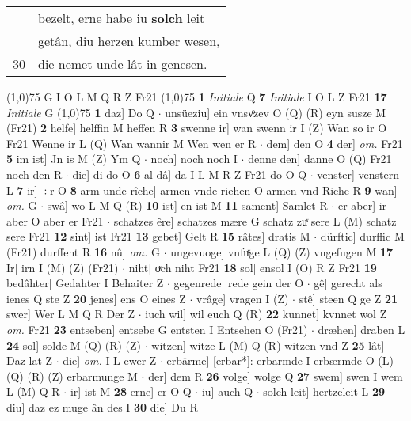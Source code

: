 \documentclass[8pt,a4paper,notitlepage]{article}
\begin{document}
\begin{table}[ht]
\begin{minipage}[t]{0.5\linewidth}
\begin{tabular}{rl}
 & bezelt, erne habe iu \textbf{solch} leit\\ 
 & getân, diu herzen kumber wesen,\\ 
30 & die nemet unde lât in genesen.\\ 
\end{tabular}
\scriptsize
\line(1,0){75} \newline
G I O L M Q R Z Fr21 \newline
\line(1,0){75} \newline
\textbf{1} \textit{Initiale} Q  \textbf{7} \textit{Initiale} I O L Z Fr21  \textbf{17} \textit{Initiale} G  \newline
\line(1,0){75} \newline
\textbf{1} daz] Do Q  $\cdot$ unsüeziu] ein vnsvͦzev O (Q) (R) eyn susze M (Fr21) \textbf{2} helfe] helffin M heffen R \textbf{3} swenne ir] wan swenn ir I (Z) Wan so ir O Fr21 Wenne ir L (Q) Wan wannir M Wen wen er R  $\cdot$ dem] den O \textbf{4} der] \textit{om.} Fr21 \textbf{5} im ist] Jn is M (Z) Ym Q  $\cdot$ noch] noch noch I  $\cdot$ denne den] danne O (Q) Fr21 noch den R  $\cdot$ die] di do O \textbf{6} al dâ] da I L M R Z Fr21 do O Q  $\cdot$ venster] venstern L \textbf{7} ir] ÷r O \textbf{8} arm unde rîche] armen vnde riehen O armen vnd Riche R \textbf{9} wan] \textit{om.} G  $\cdot$ swâ] wo L M Q (R) \textbf{10} ist] en ist M \textbf{11} sament] Samlet R  $\cdot$ er aber] ir aber O aber er Fr21  $\cdot$ schatzes êre] schatzes mære G schatz zuͯ sere L (M) schatz sere Fr21 \textbf{12} sint] ist Fr21 \textbf{13} gebet] Gelt R \textbf{15} râtes] dratis M  $\cdot$ dürftic] durffic M (Fr21) durffent R \textbf{16} nû] \textit{om.} G  $\cdot$ ungevuoge] vnfuͯge L (Q) (Z) vngefugen M \textbf{17} Ir] irn I (M) (Z) (Fr21)  $\cdot$ niht] oͮch niht Fr21 \textbf{18} sol] ensol I (O) R Z Fr21 \textbf{19} bedâhter] Gedahter I Behaiter Z  $\cdot$ gegenrede] rede gein der O  $\cdot$ gê] gerecht als ienes Q ste Z \textbf{20} jenes] ens O eines Z  $\cdot$ vrâge] vragen I (Z)  $\cdot$ stê] steen Q ge Z \textbf{21} swer] Wer L M Q R Der Z  $\cdot$ iuch wil] wil euch Q (R) \textbf{22} kunnet] kvnnet wol Z \textit{om.} Fr21 \textbf{23} entseben] entsebe G entsten I Entsehen O (Fr21)  $\cdot$ dræhen] draben L \textbf{24} sol] solde M (Q) (R) (Z)  $\cdot$ witzen] witze L (M) Q (R) witzen vnd Z \textbf{25} lât] Daz lat Z  $\cdot$ die] \textit{om.} I L ewer Z  $\cdot$ erbärme] [erbar*]: erbarmde I erbærmde O (L) (Q) (R) (Z) erbarmunge M  $\cdot$ der] dem R \textbf{26} volge] wolge Q \textbf{27} swem] swen I wem L (M) Q R  $\cdot$ ir] ist M \textbf{28} erne] er O Q  $\cdot$ iu] auch Q  $\cdot$ solch leit] hertzeleit L \textbf{29} diu] daz ez muge ân des I \textbf{30} die] Du R \newline

\end{minipage}
\end{table}
\end{document}
